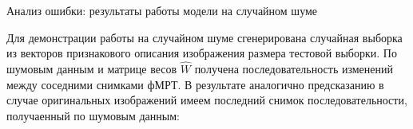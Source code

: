 \documentclass[9pt,pdf]{beamer} %
\begin{document}
\begin{frame}{Анализ ошибки: результаты работы модели на случайном шуме}

Для демонстрации работы на случайном шуме сгенерирована случайная выборка из векторов признакового описания изображения размера тестовой выборки.
По шумовым данным и матрице весов $\hat{W}$ получена последовательность изменений между соседними снимками фМРТ. 
В результате аналогично предсказанию в случае оригинальных изображений имеем последний снимок последовательности, получаенный по шумовым данным:
\begin{figure}[h!]
    \centering
    \hfill
    \hfill
    \label{fig:8}
\end{figure}
\end{frame}
\end{document}
